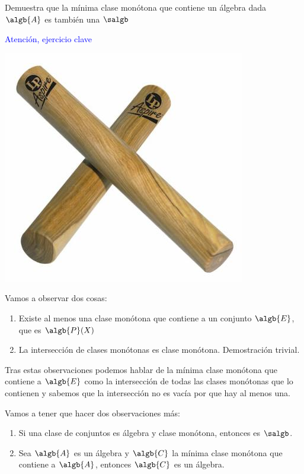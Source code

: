 \begin{problem}[14]
Demuestra que la mínima clase monótona que contiene un álgebra dada $\algb{A}$ es también una $\salgb$

\solution
\textcolor{blue}{Atención, ejercicio clave}
\begin{center}
\includegraphics[scale=0.5]{img/clave.jpg}
\end{center}

Vamos a observar dos cosas:
\begin{enumerate}
\item Existe al menos una clase monótona que contiene a un conjunto $\algb{E}$, que es $\algb{P}(X)$
\item La intersección de clases monótonas es clase monótona. Demostración trivial.
\end{enumerate}

Tras estas observaciones podemos hablar de la mínima clase monótona que contiene a $\algb{E}$ como la intersección de todas las clases monótonas que lo contienen y sabemos que la intersección no es vacía por que hay al menos una.

Vamos a tener que hacer dos observaciones más:
\begin{enumerate}
\item Si una clase de conjuntos es álgebra y clase monótona, entonces es $\salgb$.
\item Sea $\algb{A}$ es un álgebra y $\algb{C}$ la mínima clase monótona que contiene a $\algb{A}$, entonces $\algb{C}$ es un álgebra.
\end{enumerate}


\end{problem}
